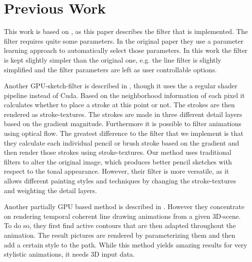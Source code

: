 \section{Previous Work}
This work is based on \cite{mainPaper}, as this paper describes the filter that
is implemented. The filter requires quite some parameters. In the original paper
they use a parameter learning approach to automatically select those parameters.
In this work the filter is kept slightly simpler than the original one, e.g.
the line filter is slightly simplified and the filter parameters are left as
user controllable options.

Another GPU-sketch-filter is described in \cite{Lu:2010:IPS}, though it uses the
a regular shader pipeline instead of Cuda. Based on the neighborhood information
of each pixel it calculates whether to place a stroke at this point or not. The
strokes are then rendered as stroke-textures. The strokes are made in three different
detail layers based on the gradient magnitude. Furthermore it is possible to filter
animations using optical flow. The greatest difference to the filter that we
implement is that they calculate each individual pencil or brush stroke based on
the gradient and then render those strokes using stroke-textures. Our method
uses traditional filters to alter the original image, which produces better
pencil sketches with respect to the tonal appearance. However, their filter is
more versatile, as it allows different painting styles and techniques by
changing the stroke-textures and weighting the detail layers.


Another partially GPU based method is described in \cite{Benard:2012:ASC}. However
they concentrate on rendering temporal coherent line drawing animations from a
given 3D-scene. To do so, they first find active contours that are then adapted throughout
the animation. The result pictures are rendered by parameterizing them and then
add a certain style to the path. While this method yields amazing results for
very stylistic animations, it needs 3D input data.
